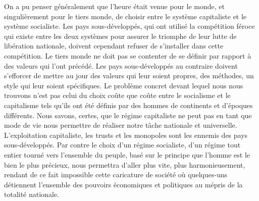\documentclass[french,twoside]{book} %
\begin{document}
\bigbreak
\noindent On a pu penser généralement que l’heure était venue pour le monde, et singulièrement pour le tiers monde, de choisir entre le système capitaliste et le système socialiste. Les pays sous-développés, qui ont utilisé la compétition féroce qui existe entre les deux systèmes pour assurer le triomphe de leur lutte de libération nationale, doivent cependant refuser de s’installer dans cette compétition. Le tiers monde ne doit pas se contenter de se définir par rapport à des valeurs qui l’ont précédé. Les pays sous-développés au contraire doivent s’efforcer de mettre au jour des valeurs qui leur soient propres, des méthodes, un style qui leur soient spécifiques. Le problème concret devant lequel nous nous trouvons n’est pas celui du choix coûte que coûte entre le socialisme et le capitalisme tels qu’ils ont été définis par des hommes de continents et d’époques différents. Nous savons, certes, que le régime capitaliste ne peut pas en tant que mode de vie nous permettre de réaliser notre tâche nationale et universelle. L’exploitation capitaliste, les trusts et les monopoles sont   les ennemis des pays sous-développés. Par contre le choix d’un régime socialiste, d’un régime tout entier tourné vers l’ensemble du peuple, basé sur le principe que l’homme est le bien le plus précieux, nous permettra d’aller plus vite, plus harmonieusement, rendant de ce fait impossible cette caricature de société où quelques-uns détiennent l’ensemble des pouvoirs économiques et politiques au mépris de la totalité nationale.\par
\end{document}
